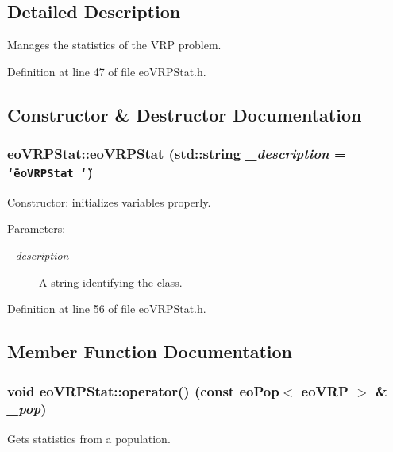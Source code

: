 \subsection{Detailed Description}
Manages the statistics of the VRP problem. 



Definition at line 47 of file eo\-VRPStat.h.

\subsection{Constructor \& Destructor Documentation}
\subsubsection{\setlength{\rightskip}{0pt plus 5cm}eo\-VRPStat::eo\-VRPStat (std::string {\em \_\-description} = {\tt \char`\"{}eoVRPStat~\char`\"{}})\hspace{0.3cm}{\tt  [inline]}}\label{classeo_v_r_p_stat_a326e09d7efebb4c572ea51ae517e058}


Constructor: initializes variables properly. 

\begin{Desc}
\item[Parameters:]
\begin{description}
\item[{\em \_\-description}]A string identifying the class. \end{description}
\end{Desc}


Definition at line 56 of file eo\-VRPStat.h.

\subsection{Member Function Documentation}
\subsubsection{\setlength{\rightskip}{0pt plus 5cm}void eo\-VRPStat::operator() (const \bf{eo\-Pop}$<$ \bf{eo\-VRP} $>$ \& {\em \_\-pop})\hspace{0.3cm}{\tt  [inline]}}\label{classeo_v_r_p_stat_5e773fab9c82e0a06d075af4be265d1e}


Gets statistics from a population. 

